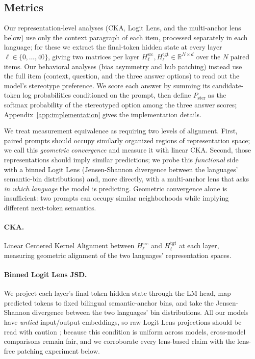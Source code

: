 \documentclass[11pt]{article}
\begin{document}
\subsection{Metrics}\label{sec:metrics}

Our representation-level analyses (CKA, Logit Lens, and the multi-anchor lens below) use only the context paragraph of each item, processed separately in each language; for these we extract the final-token hidden state at every layer $\ell \in \{0, \ldots, 40\}$, giving two matrices per layer $H^{\text{src}}_\ell, H^{\text{tgt}}_\ell \in \mathbb{R}^{N \times d}$ over the $N$ paired items. Our behavioral analyses (bias asymmetry and hub patching) instead use the full item (context, question, and the three answer options) to read out the model's stereotype preference. We score each answer by summing its candidate-token log probabilities conditioned on the prompt, then define $P_{\text{ster}}$ as the softmax probability of the stereotyped option among the three answer scores; Appendix~\ref{app:implementation} gives the implementation details.

We treat measurement equivalence as requiring two levels of alignment. First, paired prompts should occupy similarly organized regions of representation space; we call this \textit{geometric convergence} and measure it with linear CKA. Second, those representations should imply similar predictions; we probe this \textit{functional} side with a binned Logit Lens (Jensen-Shannon divergence between the languages' semantic-bin distributions) and, more directly, with a multi-anchor lens that asks \emph{in which language} the model is predicting. Geometric convergence alone is insufficient: two prompts can occupy similar neighborhoods while implying different next-token semantics.

\paragraph{CKA.} Linear Centered Kernel Alignment \citep{kornblith2019similarity} between $H^{\text{src}}_\ell$ and $H^{\text{tgt}}_\ell$ at each layer, measuring geometric alignment of the two languages' representation spaces.

\paragraph{Binned Logit Lens JSD.} We project each layer's final-token hidden state through the LM head, map predicted tokens to fixed bilingual semantic-anchor bins, and take the Jensen-Shannon divergence \citep{lin1991divergence} between the two languages' bin distributions. All our models have \emph{untied} input/output embeddings, so raw Logit Lens projections should be read with caution \citep{belrose2023eliciting}; because this condition is uniform across models, cross-model comparisons remain fair, and we corroborate every lens-based claim with the lens-free patching experiment below.
\end{document}
